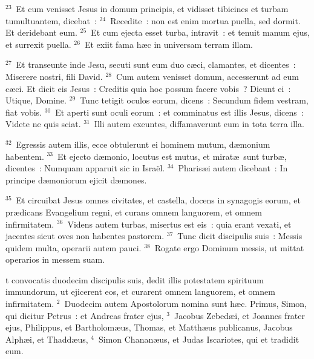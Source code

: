 ${}^{23}$~Et cum venisset Jesus in domum principis, et vidisset tibicines et turbam tumultuantem, dicebat~:
${}^{24}$~Recedite~: non est enim mortua puella, sed dormit. Et deridebant eum.
${}^{25}$~Et cum ejecta esset turba, intravit~: et tenuit manum ejus, et surrexit puella.
${}^{26}$~Et exiit fama h\ae c in universam terram illam.


${}^{27}$~Et transeunte inde Jesu, secuti sunt eum duo c\ae ci, clamantes, et dicentes~: Miserere nostri, fili David.
${}^{28}$~Cum autem venisset domum, accesserunt ad eum c\ae ci. Et dicit eis Jesus~: Creditis quia hoc possum facere vobis~? Dicunt ei~: Utique, Domine.
${}^{29}$~Tunc tetigit oculos eorum, dicens~: Secundum fidem vestram, fiat vobis.
${}^{30}$~Et aperti sunt oculi eorum~: et comminatus est illis Jesus, dicens~: Videte ne quis sciat.
${}^{31}$~Illi autem exeuntes, diffamaverunt eum in tota terra illa.


${}^{32}$~Egressis autem illis, ecce obtulerunt ei hominem mutum, d\ae monium habentem.
${}^{33}$~Et ejecto d\ae monio, locutus est mutus, et mirat\ae\ sunt turb\ae , dicentes~: Numquam apparuit sic in Isra\"el.
${}^{34}$~Pharis\ae i autem dicebant~: In principe d\ae moniorum ejicit d\ae mones.


${}^{35}$~Et circuibat Jesus omnes civitates, et castella, docens in synagogis eorum, et pr\ae dicans Evangelium regni, et curans omnem languorem, et omnem infirmitatem.
${}^{36}$~Videns autem turbas, misertus est eis~: quia erant vexati, et jacentes sicut oves non habentes pastorem.
${}^{37}$~Tunc dicit discipulis suis~: Messis quidem multa, operarii autem pauci.
${}^{38}$~Rogate ergo Dominum messis, ut mittat operarios in messem suam.

\bchapter
{}t convocatis duodecim discipulis suis, dedit illis potestatem spirituum immundorum, ut ejicerent eos, et curarent omnem languorem, et omnem infirmitatem.
${}^{2}$~Duodecim autem Apostolorum nomina sunt h\ae c. Primus, Simon, qui dicitur Petrus~: et Andreas frater ejus,
${}^{3}$~Jacobus Zebed\ae i, et Joannes frater ejus, Philippus, et Bartholom\ae us, Thomas, et Matth\ae us publicanus, Jacobus Alph\ae i, et Thadd\ae us,
${}^{4}$~Simon Chanan\ae us, et Judas Iscariotes, qui et tradidit eum.


